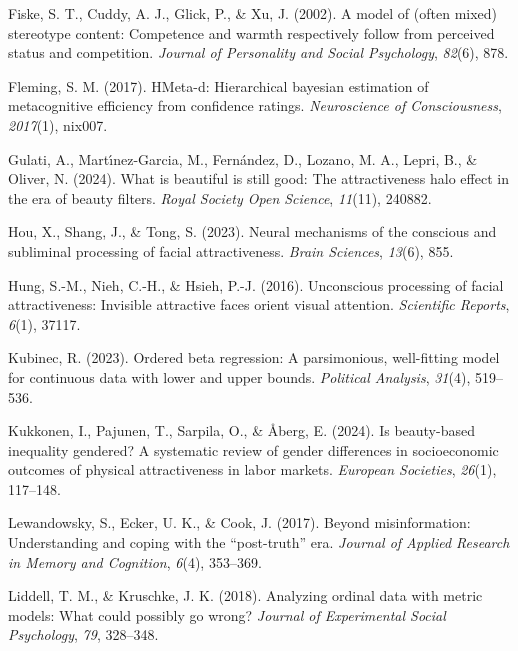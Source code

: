 \documentclass[
  jou,
  floatsintext,
  longtable,
  nolmodern,
  notxfonts,
  notimes,
  colorlinks=true,linkcolor=blue,citecolor=blue,urlcolor=blue]{apa7}
\newlength{\cslhangindent}
\newenvironment{CSLReferences}[2] %
 {\begin{list}{}{%
  \setlength{\itemindent}{0pt}
  \setlength{\leftmargin}{0pt}
  \setlength{\parsep}{0pt}
  \ifodd #1
   \setlength{\leftmargin}{\cslhangindent}
   \setlength{\itemindent}{-1\cslhangindent}
  \fi
  \setlength{\itemsep}{#2\baselineskip}}}
 {\end{list}}
\begin{document}
\begin{CSLReferences}{1}{0}
Fiske, S. T., Cuddy, A. J., Glick, P., \& Xu, J. (2002). A model of
(often mixed) stereotype content: Competence and warmth respectively
follow from perceived status and competition. \emph{Journal of
Personality and Social Psychology}, \emph{82}(6), 878.

Fleming, S. M. (2017). HMeta-d: Hierarchical bayesian estimation of
metacognitive efficiency from confidence ratings. \emph{Neuroscience of
Consciousness}, \emph{2017}(1), nix007.

Gulati, A., Martı́nez-Garcia, M., Fernández, D., Lozano, M. A., Lepri,
B., \& Oliver, N. (2024). What is beautiful is still good: The
attractiveness halo effect in the era of beauty filters. \emph{Royal
Society Open Science}, \emph{11}(11), 240882.

Hou, X., Shang, J., \& Tong, S. (2023). Neural mechanisms of the
conscious and subliminal processing of facial attractiveness.
\emph{Brain Sciences}, \emph{13}(6), 855.

Hung, S.-M., Nieh, C.-H., \& Hsieh, P.-J. (2016). Unconscious processing
of facial attractiveness: Invisible attractive faces orient visual
attention. \emph{Scientific Reports}, \emph{6}(1), 37117.

Kubinec, R. (2023). Ordered beta regression: A parsimonious,
well-fitting model for continuous data with lower and upper bounds.
\emph{Political Analysis}, \emph{31}(4), 519--536.

Kukkonen, I., Pajunen, T., Sarpila, O., \& Åberg, E. (2024). Is
beauty-based inequality gendered? A systematic review of gender
differences in socioeconomic outcomes of physical attractiveness in
labor markets. \emph{European Societies}, \emph{26}(1), 117--148.

Lewandowsky, S., Ecker, U. K., \& Cook, J. (2017). Beyond
misinformation: Understanding and coping with the {``post-truth''} era.
\emph{Journal of Applied Research in Memory and Cognition}, \emph{6}(4),
353--369.

Liddell, T. M., \& Kruschke, J. K. (2018). Analyzing ordinal data with
metric models: What could possibly go wrong? \emph{Journal of
Experimental Social Psychology}, \emph{79}, 328--348.


\end{CSLReferences}
\end{document}

